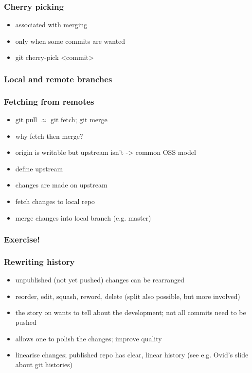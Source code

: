 \documentclass{git_course}
\begin{document}
\begin{frame}
\frametitle{Cherry picking}
\begin{itemize}
    \item associated with merging
    \item only when some commits are wanted
    \item git cherry-pick <commit>
\end{itemize}
\end{frame}

\begin{frame}
\frametitle{Local and remote branches}
\end{frame}

\begin{frame}
\frametitle{Fetching from remotes}
\begin{itemize}
    \item git pull $\approx$ git fetch; git merge
    \item why fetch then merge?
    \item origin is writable but upstream isn't -> common OSS model
    \item define upstream
    \item changes are made on upstream
    \item fetch changes to local repo
    \item merge changes into local branch (e.g. master)
\end{itemize}
\end{frame}

\begin{frame}
\frametitle{Exercise!}
\end{frame}

\begin{frame}
\frametitle{Rewriting history}
\begin{itemize}
    \item unpublished (not yet pushed) changes can be rearranged
    \item reorder, edit, squash, reword, delete (split also possible,
        but more involved)
    \item the story on wants to tell about the development; not all
        commits need to be pushed
    \item allows one to polish the changes; improve quality
    \item linearise changes; published repo has clear, linear history
        (see e.g. Ovid's slide about git histories)
\end{itemize}
\end{frame}
\end{document}
